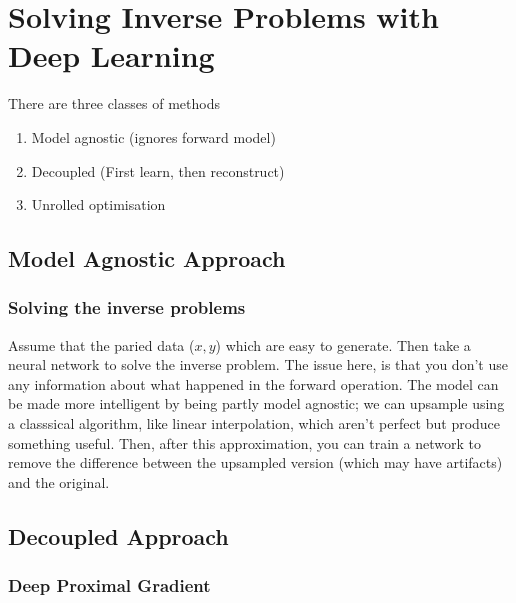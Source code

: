 \documentclass[11pt]{article}
\begin{document}
\section{Solving Inverse Problems with Deep Learning}

There are three classes of methods

\begin{enumerate}
    \item Model agnostic (ignores forward model)
    \item Decoupled (First learn, then reconstruct)
    \item Unrolled optimisation
\end{enumerate}

\subsection{Model Agnostic Approach}

\subsubsection{Solving the inverse problems}

\begin{figure}[H]
    \centering
\end{figure}    

Assume that the paried data ($x,y$) which are easy to generate. Then take a neural network to solve the inverse problem. The issue here, is that you don't use any information about what happened in the forward operation. The model can be made more intelligent by being partly model agnostic; we can upsample using a classsical algorithm, like linear interpolation, which aren't perfect but produce something useful. Then, after this approximation, you can train a network to remove the difference between the upsampled version (which may have artifacts) and the original.

\subsection{Decoupled Approach}

\subsubsection{Deep Proximal Gradient}
\end{document}
